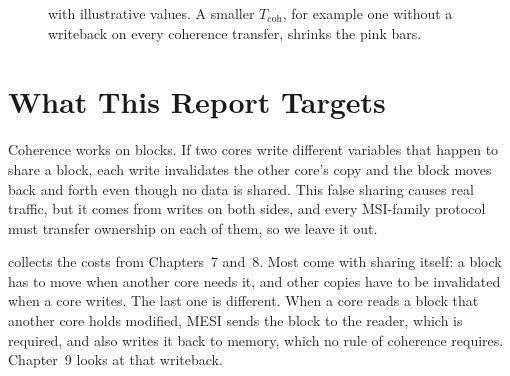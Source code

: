 \begin{figure}[htbp]
\centering
{}
\caption[AMAT with a coherence term]{ with illustrative values.
A smaller $T_{\mathrm{coh}}$, for example one without a writeback on every
coherence transfer, shrinks the pink bars.}
\label{fig:amat-bars}
\end{figure}

\section{What This Report Targets}
\label{sec:scale-target}
\label{sec:scale-false}
%

Coherence works on blocks. If two cores write different variables that happen to
share a block, each write invalidates the other core's copy and the block moves
back and forth even though no data is shared. This false
sharing causes real traffic, but it comes from writes on both
sides, and every MSI-family protocol must transfer ownership on each of them, so
we leave it out.

 collects the costs from Chapters~7 and~8. Most come with
sharing itself: a block has to move when another core needs it, and other copies
have to be invalidated when a core writes. The last one is different. When a core
reads a block that another core holds modified, MESI sends the block to the
reader, which is required, and also writes it back to memory, which no rule of
coherence requires. Chapter~9 looks at that writeback.

